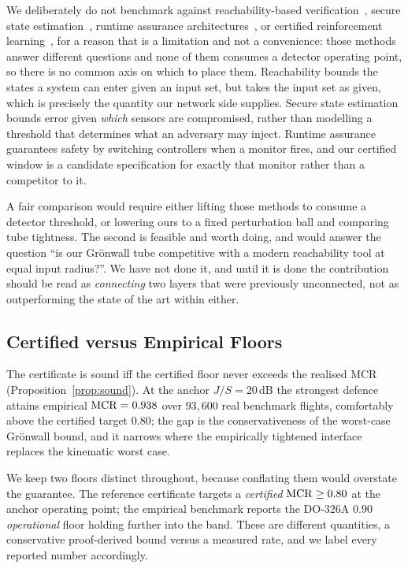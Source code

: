 We deliberately do not benchmark against reachability-based
verification~\cite{ivanov2019verisig,tran2020nnv}, secure state
estimation~\cite{fawzi2014secure,shoukry2017smt}, runtime assurance
architectures~\cite{sha2001simplex,mehmood2022blackbox,cofer2020rta}, or
certified reinforcement learning~\cite{wu2022crop,everett2021carrl}, for a
reason that is a limitation and not a convenience: those methods answer
different questions and none of them consumes a detector operating point, so
there is no common axis on which to place them. Reachability bounds the states a
system can enter given an input set, but takes the input set as given, which is
precisely the quantity our network side supplies. Secure state estimation bounds
error given \emph{which} sensors are compromised, rather than modelling a
threshold that determines what an adversary may inject. Runtime assurance
guarantees safety by switching controllers when a monitor fires, and our
certified window is a candidate specification for exactly that monitor rather
than a competitor to it.

A fair comparison would require either lifting those methods to consume a
detector threshold, or lowering ours to a fixed perturbation ball and comparing
tube tightness. The second is feasible and worth doing, and would answer the
question ``is our Gr\"onwall tube competitive with a modern reachability tool at
equal input radius?''. We have not done it, and until it is done the
contribution should be read as \emph{connecting} two layers that were previously
unconnected, not as outperforming the state of the art within either.

\subsection{Certified versus Empirical Floors}
The certificate is sound iff the certified floor never exceeds the realised MCR
(Proposition~\ref{prop:sound}). At the anchor $J/S=20$\,dB the strongest defence
attains empirical $\mathrm{MCR}=0.938$ over $93{,}600$ real benchmark flights,
comfortably above the certified target $0.80$; the gap is the conservativeness
of the worst-case Gr\"onwall bound, and it narrows where the empirically
tightened interface replaces the kinematic worst case.

We keep two floors distinct throughout, because conflating them would overstate
the guarantee. The reference certificate targets a \emph{certified}
$\mathrm{MCR}\ge0.80$ at the anchor operating point; the empirical benchmark reports the
DO-326A $0.90$ \emph{operational} floor holding further into the band. These are
different quantities, a conservative proof-derived bound versus a measured
rate, and we label every reported number accordingly.

